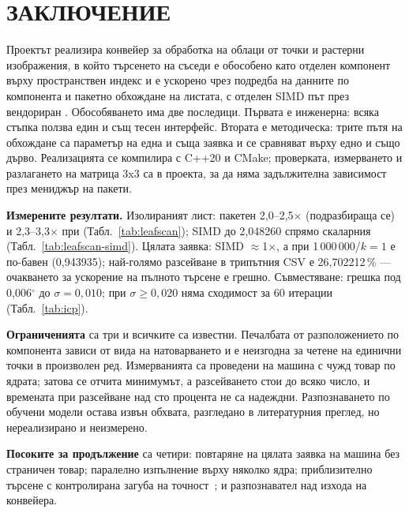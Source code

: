 \section*{ЗАКЛЮЧЕНИЕ}
\label{sec:conclusion}

Проектът реализира конвейер за обработка на облаци от точки и растерни изображения, в
който търсенето на съседи е обособено като отделен компонент върху пространствен индекс и
е ускорено чрез подредба на данните по компонента и пакетно обхождане на листата, с
отделен SIMD път през вендориран . Обособяването има две последици. Първата е
инженерна: всяка стъпка ползва един и същ тесен интерфейс. Втората е методическа: трите
пътя на обхождане са параметър на една и съща заявка и се сравняват върху едно и също
дърво. Реализацията се компилира с C++20 и CMake; проверката, измерването и разлагането на
матрица 3x3 са в проекта, за да няма задължителна зависимост през мениджър на пакети.

\textbf{Измерените резултати.} Изолираният лист: пакетен 2,0--2,5$\times$ (подразбираща се) и
2,3--3,3$\times$ при  (Табл.~\ref{tab:leafscan}); SIMD до 2{,}048260
спрямо скаларния (Табл.~\ref{tab:leafscan-simd}). Цялата заявка: SIMD $\approx$1$\times$, а при
1\,000\,000/$k{=}1$ е по-бавен (0{,}943935); най-голямо разсейване в трипътния CSV е
26{,}702212\,\% --- очакването за ускорение на пълното търсене е грешно.
Съвместяване: грешка под 0,006$^\circ$ до $\sigma{=}0{,}010$; при $\sigma\ge 0{,}020$ няма
сходимост за 60 итерации (Табл.~\ref{tab:icp}).

\textbf{Ограниченията} са три и всичките са известни. Печалбата от разположението по
компонента зависи от вида на натоварването и е неизгодна за четене на единични точки в
произволен ред. Измерванията са проведени на машина с чужд товар по ядрата; затова се
отчита минимумът, а разсейването стои до всяко число, и времената при разсейване над сто
процента не са надеждни. Разпознаването по обучени модели остава извън обхвата, разгледано
в литературния преглед, но нереализирано и неизмерено.

\textbf{Посоките за продължение} са четири: повтаряне на цялата заявка на машина без страничен
товар; паралелно изпълнение върху няколко ядра; приблизително търсене с контролирана загуба
на точност~\cite{muja2014flann}; и разпознавател над изхода на конвейера.
